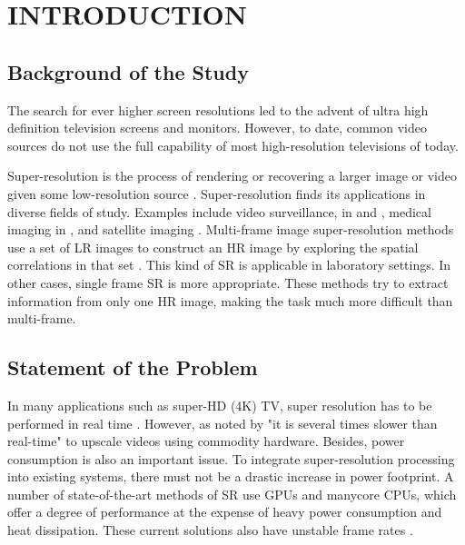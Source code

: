 
\chapter{INTRODUCTION} %

\label{Chapter1} %



\section{Background of the Study}
The search for ever higher screen resolutions led to the advent of ultra high definition television screens and monitors. However, to date, common video sources do not use the full capability of most high-resolution televisions of today.

Super-resolution is the process of rendering or recovering a larger image or video given some low-resolution source \citep{Dong2014}.
Super-resolution finds its applications in diverse fields of study. Examples include video surveillance, in \cite{Caner2003} and \cite{Zhang2010},  medical imaging in \cite{Malczewski2008}, and satellite imaging . %
Multi-frame image super-resolution methods use a set of LR images to construct an HR image by exploring the spatial correlations in that set \citep{Cheng2013}.
This kind of SR is applicable in laboratory settings.
In other cases, single frame SR is more appropriate. 
These methods try to extract information from only one HR image, making the task much more difficult than multi-frame.



\section{Statement of the Problem}

In many applications such as super-HD (4K) TV, super resolution has to be performed in real time \citep{Shen2014}. However, as noted by \cite{Ishizaka2013} "it is several times slower than real-time" to upscale videos using commodity hardware.
Besides, power consumption is also an important issue. 
To integrate super-resolution processing into existing systems, there must not be a drastic increase in power footprint. 
A number of state-of-the-art methods of SR use GPUs and manycore CPUs, which offer a degree of performance at the expense of heavy power consumption and heat dissipation. 
These current solutions also have unstable frame rates \citep{Wu2011}. 


